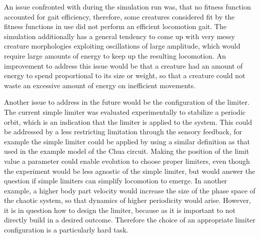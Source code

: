 \documentclass[main]{subfiles}
\begin{document}
An issue confronted with during the simulation run was, that no fitness function accounted for gait efficiency, therefore, some creatures considered fit by the fitness functions in use did not perform an efficient locomotion gait. %
%
The simulation additionally has a general tendency to come up with very messy creature morphologies exploiting oscillations of large amplitude, which would require large amounts of energy to keep up the resulting locomotion. %
%
An improvement to address this issue would be that a creature had an amount of energy to spend proportional to its size or weight, so that a creature could not waste an excessive amount of energy on inefficient movements. %

Another issue to address in the future would be the configuration of the limiter. %
%
The current simple limiter was evaluated experimentally to stabilize a periodic orbit, which is an indication that the limiter is applied to the system. %
%
This could be addressed by a less restricting limitation through the sensory feedback, for example the simple limiter could be applied by using a similar definition as that used in the example model of the Chua circuit. %
%
Making the position of the limit value a parameter could enable evolution to choose proper limiters, even though the experiment would be less agnostic of the simple limiter, but would answer the question if simple limiters can simplify locomotion to emerge. %
%
In another example, a higher body part velocity would increase the size of the phase space of the chaotic system, so that dynamics of higher periodicity would arise. %
%
However, it is in question how to design the limiter, because as it is important to not directly build in a desired outcome. %
%
Therefore the choice of an appropriate limiter configuration is a particularly hard task.
\end{document}
